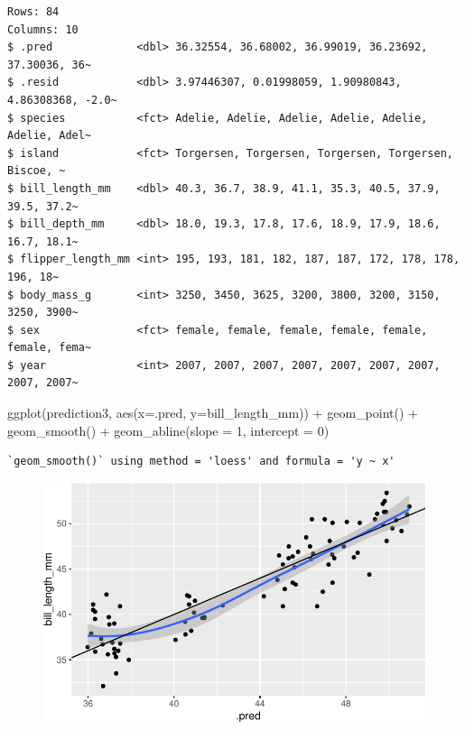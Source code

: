 \documentclass[
  letterpaper,
  DIV=11,
  numbers=noendperiod]{scrreprt}
\newenvironment{Shaded}{\begin{snugshade}}{\end{snugshade}}
\newcommand{\AttributeTok}[1]{\textcolor[rgb]{0.40,0.45,0.13}{#1}}
\newcommand{\DecValTok}[1]{\textcolor[rgb]{0.68,0.00,0.00}{#1}}
\newcommand{\FunctionTok}[1]{\textcolor[rgb]{0.28,0.35,0.67}{#1}}
\newcommand{\NormalTok}[1]{\textcolor[rgb]{0.00,0.23,0.31}{#1}}
\newcommand{\SpecialCharTok}[1]{\textcolor[rgb]{0.37,0.37,0.37}{#1}}
\begin{document}
\begin{verbatim}
Rows: 84
Columns: 10
$ .pred             <dbl> 36.32554, 36.68002, 36.99019, 36.23692, 37.30036, 36~
$ .resid            <dbl> 3.97446307, 0.01998059, 1.90980843, 4.86308368, -2.0~
$ species           <fct> Adelie, Adelie, Adelie, Adelie, Adelie, Adelie, Adel~
$ island            <fct> Torgersen, Torgersen, Torgersen, Torgersen, Biscoe, ~
$ bill_length_mm    <dbl> 40.3, 36.7, 38.9, 41.1, 35.3, 40.5, 37.9, 39.5, 37.2~
$ bill_depth_mm     <dbl> 18.0, 19.3, 17.8, 17.6, 18.9, 17.9, 18.6, 16.7, 18.1~
$ flipper_length_mm <int> 195, 193, 181, 182, 187, 187, 172, 178, 178, 196, 18~
$ body_mass_g       <int> 3250, 3450, 3625, 3200, 3800, 3200, 3150, 3250, 3900~
$ sex               <fct> female, female, female, female, female, female, fema~
$ year              <int> 2007, 2007, 2007, 2007, 2007, 2007, 2007, 2007, 2007~
\end{verbatim}

\begin{Shaded}
\begin{Highlighting}[]
\FunctionTok{ggplot}\NormalTok{(prediction3, }\FunctionTok{aes}\NormalTok{(}\AttributeTok{x=}\NormalTok{.pred, }\AttributeTok{y=}\NormalTok{bill\_length\_mm)) }\SpecialCharTok{+} \FunctionTok{geom\_point}\NormalTok{() }\SpecialCharTok{+} \FunctionTok{geom\_smooth}\NormalTok{() }\SpecialCharTok{+} \FunctionTok{geom\_abline}\NormalTok{(}\AttributeTok{slope =} \DecValTok{1}\NormalTok{, }\AttributeTok{intercept =} \DecValTok{0}\NormalTok{)}
\end{Highlighting}
\end{Shaded}

\begin{verbatim}
`geom_smooth()` using method = 'loess' and formula = 'y ~ x'
\end{verbatim}

\begin{figure}[H]

{\centering \includegraphics{./10-model_selection_files/figure-pdf/unnamed-chunk-33-1.pdf}

}

\end{figure}
\end{document}
